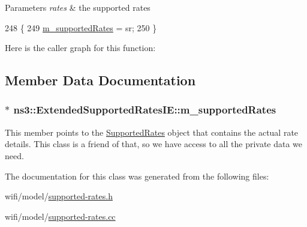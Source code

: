 \begin{DoxyParams}{Parameters}
{\em rates} & the supported rates \\
\hline
\end{DoxyParams}

\begin{DoxyCode}
248 \{
249   \hyperlink{classns3_1_1ExtendedSupportedRatesIE_a368d0fc67f15b3c677075ffb54910d5c}{m\_supportedRates} = sr;
250 \}
\end{DoxyCode}


Here is the caller graph for this function\+:




\subsection{Member Data Documentation}
\subsubsection[{\texorpdfstring{m\+\_\+supported\+Rates}{m_supportedRates}}]{$\ast$ ns3\+::\+Extended\+Supported\+Rates\+I\+E\+::m\+\_\+supported\+Rates\hspace{0.3cm}{\ttfamily [private]}}\hypertarget{classns3_1_1ExtendedSupportedRatesIE_a368d0fc67f15b3c677075ffb54910d5c}{}\label{classns3_1_1ExtendedSupportedRatesIE_a368d0fc67f15b3c677075ffb54910d5c}
This member points to the \hyperlink{classns3_1_1SupportedRates}{Supported\+Rates} object that contains the actual rate details. This class is a friend of that, so we have access to all the private data we need. 

The documentation for this class was generated from the following files\+:\begin{DoxyCompactItemize}
\item 
wifi/model/\hyperlink{supported-rates_8h}{supported-\/rates.\+h}\item 
wifi/model/\hyperlink{supported-rates_8cc}{supported-\/rates.\+cc}\end{DoxyCompactItemize}
